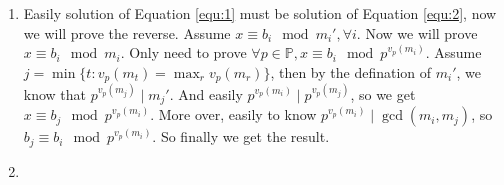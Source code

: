 \documentclass{ctexart}
\begin{document}
\begin{solution}
  \begin{enumerate}
    \item
      Easily solution of Equation \eqref{equ:1} must be solution of Equation \eqref{equ:2}, now we will prove the reverse.
      Assume \(x \equiv b_i \mod m_i',\forall i\). Now we will prove \(x \equiv b_i \mod m_i\).
      Only need to prove \(\forall p \in \mathbb{P},x \equiv b_i \mod p^{v_p(m_i)}\).
      Assume \(j=\min \{t:v_p(m_t)=\max_{r}v_p(m_r)\}\), then by the defination of \(m_i'\), we know that \(p^{v_p(m_j)} \mid m_j'\).
      And easily \(p^{v_p(m_i)} \mid p^{v_p(m_j)}\), so we get \(x \equiv b_j \mod p^{v_p(m_i)}\).
      More over, easily to know \(p^{v_p(m_i)} \mid \gcd(m_i,m_j)\), so \(b_j \equiv b_i \mod p^{v_p(m_i)}\).
      So finally we get the result.
    \item
  \end{enumerate}

\end{solution}
\end{document}
